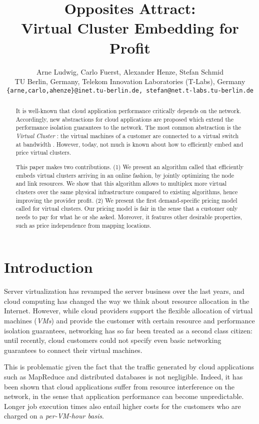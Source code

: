 \documentclass{sig-alternate-per}
\title{Opposites Attract: \\ Virtual Cluster Embedding for Profit}
\author {
   Arne Ludwig,
   Carlo Fuerst,
   Alexander Henze,
   Stefan Schmid\\
\small{ TU Berlin, Germany,  Telekom Innovation Laboratories (T-Labs),
Germany}\\
\small{\texttt{\{arne,carlo,ahenze\}@inet.tu-berlin.de, stefan@net.t-labs.tu-berlin.de}}\\
}
\begin{document}
\maketitle

\sloppy

\begin{abstract}
It is well-known that cloud application performance critically depends
on the network. Accordingly, new abstractions for cloud applications are
proposed which extend the performance isolation guarantees to the network.
The most common abstraction is the \emph{Virtual Cluster} : the  virtual
machines of a customer are connected to a virtual switch at bandwidth .
However, today, not much is known about how to efficiently embed and price
virtual clusters.

This paper makes two contributions. (1) We present an algorithm called  that
efficiently
embeds virtual clusters arriving in an online fashion, by jointly optimizing the node and link resources.
We show that this algorithm allows to multiplex more virtual clusters over the same physical
infrastructure compared to existing algorithms,
hence improving the provider profit. (2)
We present the first demand-specific pricing model called  for virtual clusters. Our pricing model is fair in the sense
that a customer only needs to pay for what he or she asked. Moreover, it
features other desirable properties, such as price independence from mapping locations.
\end{abstract}

\section{Introduction}

Server virtualization has revamped the server business over the last years,
and cloud computing has changed the way we think about resource allocation in the Internet.
However, while cloud providers support the flexible allocation of virtual machines (\emph{VMs}) and
provide the customer with certain resource and performance isolation guarantees,
networking has so far been treated as a second class citizen: until recently,
cloud customers could not specify even basic networking guarantees to connect their virtual
machines.

This is problematic given the fact that the traffic generated by cloud applications such as MapReduce and distributed
databases
is not negligible. Indeed, it has been shown that cloud applications suffer from resource interference
on the network, in the sense that application performance can become unpredictable. Longer job execution times
also entail higher costs for the customers who are charged on a \emph{per-VM-hour basis}.~\cite{short-talk-about}
\end{document}
